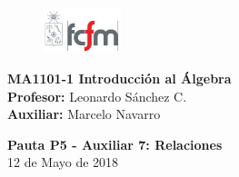 \documentclass[letterpaper,11pt]{article}
\theoremstyle{plain}
\begin{document}
\newpage
\pagestyle{fancy}
\fancyhf{}

\begin{figure} %
    \vspace{-5mm}
    \includegraphics[width=0.2\textwidth]{img/fcfm2.png}
\end{figure}


\noindent
\textbf{MA1101-1 Introducción al Álgebra}\\
\textbf{Profesor: }Leonardo Sánchez C.\\
\textbf{Auxiliar: }Marcelo Navarro

\begin{center}
{\bf \Large Pauta P5 - Auxiliar 7: Relaciones}\\
{12 de Mayo de 2018}
\end{center}
\end{document}
